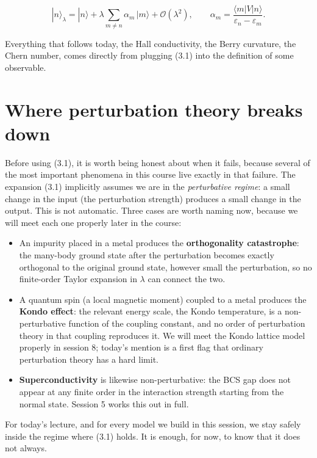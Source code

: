 \begin{equation}
|n\rangle_\lambda = |n\rangle + \lambda \sum_{m \neq n} \alpha_m\, |m\rangle + \mathcal{O}(\lambda^2),
\qquad \alpha_m = \frac{\langle m|V|n\rangle}{\varepsilon_n - \varepsilon_m}.
\end{equation}

Everything that follows today, the Hall conductivity, the Berry curvature, the Chern number, comes
directly from plugging (3.1) into the definition of some observable.

\section{Where perturbation theory breaks down}

Before using (3.1), it is worth being honest about when it fails, because several of the most
important phenomena in this course live exactly in that failure. The expansion (3.1) implicitly
assumes we are in the \emph{perturbative regime}: a small change in the input (the perturbation strength)
produces a small change in the output. This is not automatic. Three cases are worth naming now,
because we will meet each one properly later in the course:

\begin{itemize}
\item An impurity placed in a metal produces the \textbf{orthogonality catastrophe}: the many-body ground
  state after the perturbation becomes exactly orthogonal to the original ground state, however
  small the perturbation, so no finite-order Taylor expansion in $\lambda$ can connect the two.
\item A quantum spin (a local magnetic moment) coupled to a metal produces the \textbf{Kondo effect}: the
  relevant energy scale, the Kondo temperature, is a non-perturbative function of the coupling
  constant, and no order of perturbation theory in that coupling reproduces it. We will meet the
  Kondo lattice model properly in session 8; today's mention is a first flag that ordinary
  perturbation theory has a hard limit.
\item \textbf{Superconductivity} is likewise non-perturbative: the BCS gap does not appear at any finite order
  in the interaction strength starting from the normal state. Session 5 works this out in full.
\end{itemize}

For today's lecture, and for every model we build in this session, we stay safely inside the regime
where (3.1) holds. It is enough, for now, to know that it does not always.

